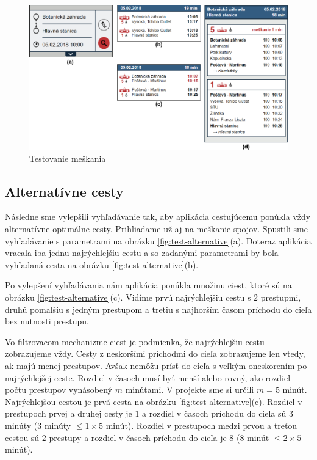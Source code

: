\begin{figure}[H]
\centerline{\includegraphics[width=1.0\textwidth]{images/test/delay}}
\caption[Testovanie meškania]{Testovanie meškania}
\label{fig:test-delay}
\end{figure}

\subsection{Alternatívne cesty}
Následne sme vylepšili vyhľadávanie tak, aby aplikácia cestujúcemu ponúkla vždy alternatívne optimálne cesty. Prihliadame už aj na meškanie spojov. Spustili sme vyhľadávanie s parametrami na obrázku \ref{fig:test-alternative}(a). Doteraz aplikácia vracala iba jednu najrýchlejšiu cestu a so zadanými parametrami by bola vyhľadaná cesta na obrázku \ref{fig:test-alternative}(b).

Po vylepšení vyhľadávania nám aplikácia ponúkla množinu ciest, ktoré sú na obrázku \ref{fig:test-alternative}(c). Vidíme prvú najrýchlejšiu cestu s $2$ prestupmi, druhú pomalšiu s jedným prestupom a tretiu s najhorším časom príchodu do cieľa bez nutnosti prestupu. 

Vo filtrovacom mechanizme ciest je podmienka, že najrýchlejšiu cestu zobrazujeme vždy. Cesty z neskoršími príchodmi do cieľa zobrazujeme len vtedy, ak majú menej prestupov. Avšak nemôžu prísť do cieľa s veľkým oneskorením po najrýchlejšej ceste. Rozdiel v časoch musí byť menší alebo rovný, ako rozdiel počtu prestupov vynásobený $m$ minútami. V projekte sme si určili $m = 5$ minút. Najrýchlejšou cestou je prvá cesta na obrázku \ref{fig:test-alternative}(c). Rozdiel v prestupoch prvej a druhej cesty je $1$ a rozdiel v časoch príchodu do cieľa sú $3$ minúty ($3$ minúty $\leq 1\times5$ minút).
Rozdiel v prestupoch medzi prvou a treťou cestou sú $2$ prestupy a rozdiel v časoch príchodu do cieľa je $8$ ($8$ minút $\leq 2\times5$ minút).

